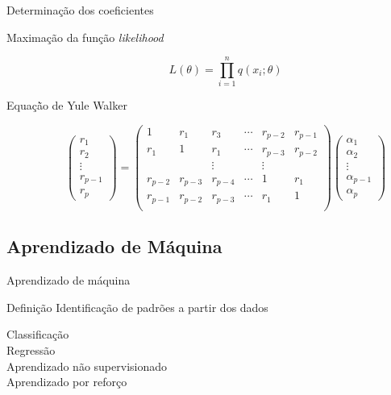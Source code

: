 \documentclass[compress,aspectratio=149,brazil]{beamer}
\begin{document}
\begin{frame}{Determinação dos coeficientes}
    \begin{description}
        \item[\alert<2>{Maximação da função \textit{likelihood}}]
        \[
            L(\theta) = \prod_{i=1}^{n}{q(x_i;\theta)}
        \]
        \item[Equaçã̀o de Yule Walker]
        \[
            \begin{pmatrix}
                r_1\\
                r_2\\
                \vdots\\
                r_{p-1}\\
                r_p
            \end{pmatrix} =
            \begin{pmatrix}
                1 & r_1 & r_3 & \cdots & r_{p-2} & r_{p-1} \\
                r_1 & 1 & r_1 & \cdots & r_{p-3} & r_{p-2} \\
                & & \vdots & & \vdots & \\
                r_{p-2} & r_{p-3} & r_{p-4} & \cdots & 1 & r_1 \\
                r_{p-1} & r_{p-2} & r_{p-3} & \cdots & r_1 & 1 \\
            \end{pmatrix}
            \begin{pmatrix}
                \alpha_1\\
                \alpha_2\\
                \vdots\\
                \alpha_{p-1}\\
                \alpha_p
            \end{pmatrix}
        \]
    \end{description}
\end{frame}

\subsection{Aprendizado de Máquina}

\begin{frame}{Aprendizado de máquina}
    \begin{block}{Definição}
        Identificação de padrões a partir dos dados
    \end{block}
    \begin{description}
        \item[Classificação]
        \item[\alert<2>{Regressão}]
        \item[Aprendizado não supervisionado]
        \item[Aprendizado por reforço]
    \end{description}
\end{frame}
\end{document}
